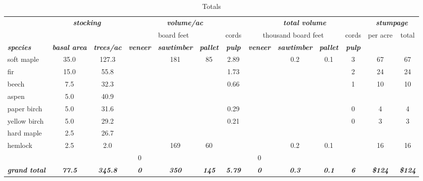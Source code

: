\documentclass[landscape]{article}
\begin{document}
\begin{table}[H]

\caption{\label{tab:unnamed-chunk-30}Totals}
\fontsize{10}{12}\selectfont
\begin{tabular}[t]{lcccccccccccc}
\toprule
\multicolumn{1}{c}{\em{\textbf{ }}} & \multicolumn{2}{c}{\em{\textbf{stocking}}} & \multicolumn{4}{c}{\em{\textbf{volume/ac }}} & \multicolumn{4}{c}{\em{\textbf{total volume}}} & \multicolumn{2}{c}{\em{\textbf{stumpage}}} \\
\cmidrule(l{3pt}r{3pt}){2-3} \cmidrule(l{3pt}r{3pt}){4-7} \cmidrule(l{3pt}r{3pt}){8-11} \cmidrule(l{3pt}r{3pt}){12-13}
\multicolumn{3}{c}{ } & \multicolumn{3}{c}{board feet} & \multicolumn{1}{c}{cords} & \multicolumn{3}{c}{thousand board feet} & \multicolumn{1}{c}{cords} & \multicolumn{1}{c}{per acre} & \multicolumn{1}{c}{total} \\
\cmidrule(l{3pt}r{3pt}){4-6} \cmidrule(l{3pt}r{3pt}){7-7} \cmidrule(l{3pt}r{3pt}){8-10} \cmidrule(l{3pt}r{3pt}){11-11} \cmidrule(l{3pt}r{3pt}){12-12} \cmidrule(l{3pt}r{3pt}){13-13}
\rowcolor[HTML]{DCDCDC}  \em{\textbf{species}} & \em{\textbf{basal area}} & \em{\textbf{trees/ac}} & \em{\textbf{veneer}} & \em{\textbf{sawtimber}} & \em{\textbf{pallet}} & \em{\textbf{pulp}} & \em{\textbf{veneer}} & \em{\textbf{sawtimber}} & \em{\textbf{pallet}} & \em{\textbf{pulp}} & \em{\textbf{ }} & \em{\textbf{ }}\\
\midrule
\rowcolor{gray!6}  soft maple & 35.0 & 127.3 &  & 181 & 85 & 2.89 &  & 0.2 & 0.1 & 3 & 67 & 67\\
 
fir & 15.0 & 55.8 &  &  &  & 1.73 &  &  &  & 2 & 24 & 24\\
 
\rowcolor{gray!6}  beech & 7.5 & 32.3 &  &  &  & 0.66 &  &  &  & 1 & 10 & 10\\
 
aspen & 5.0 & 40.9 &  &  &  &  &  &  &  &  &  & \\
 
\rowcolor{gray!6}  paper birch & 5.0 & 31.6 &  &  &  & 0.29 &  &  &  & 0 & 4 & 4\\
 
yellow birch & 5.0 & 29.2 &  &  &  & 0.21 &  &  &  & 0 & 3 & 3\\
 
\rowcolor{gray!6}  hard maple & 2.5 & 26.7 &  &  &  &  &  &  &  &  &  & \\
 
hemlock & 2.5 & 2.0 &  & 169 & 60 &  &  & 0.2 & 0.1 &  & 16 & 16\\
 
\rowcolor{gray!6}   &  &  & 0 &  &  &  & 0 &  &  &  &  & \\
 
\rowcolor[HTML]{DCDCDC}  \em{\textbf{grand total}} & \em{\textbf{77.5}} & \em{\textbf{345.8}} & \em{\textbf{0}} & \em{\textbf{350}} & \em{\textbf{145}} & \em{\textbf{5.79}} & \em{\textbf{0}} & \em{\textbf{0.3}} & \em{\textbf{0.1}} & \em{\textbf{6}} & \em{\textbf{\$124}} & \em{\textbf{\$124}}\\
\bottomrule
\end{tabular}
\end{table}
\end{document}
